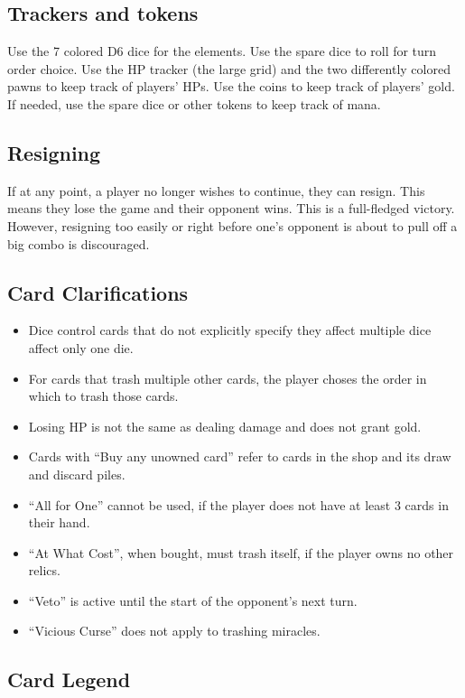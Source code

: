 \documentclass[dvipsnames,parskip,a4paper]{scrartcl}
\begin{document}
\subsection*{Trackers and tokens}

Use the 7 colored D6 dice for the elements. Use the spare dice to roll for turn order choice. Use the HP tracker (the large grid) and the two differently colored pawns to keep track of players' HPs. Use the coins to keep track of players' gold. If needed, use the spare dice or other tokens to keep track of mana.

\subsection*{Resigning}

If at any point, a player no longer wishes to continue, they can resign. This means they lose the game and their opponent wins. This is a full-fledged victory. However, resigning too easily or right before one's opponent is about to pull off a big combo is discouraged.

\subsection*{Card Clarifications}

\begin{itemize}
\item Dice control cards that do not explicitly specify they affect multiple dice affect only one die.
\item For cards that trash multiple other cards, the player choses the order in which to trash those cards.
\item Losing HP is not the same as dealing damage and does not grant gold.
\item Cards with ``Buy any unowned card'' refer to cards in the shop and its draw and discard piles.
\item ``All for One'' cannot be used, if the player does not have at least 3 cards in their hand.
\item ``At What Cost'', when bought, must trash itself, if the player owns no other relics.
\item ``Veto'' is active until the start of the opponent's next turn.
\item ``Vicious Curse'' does not apply to trashing miracles.
\end{itemize}

\subsection*{Card Legend}
\end{document}
